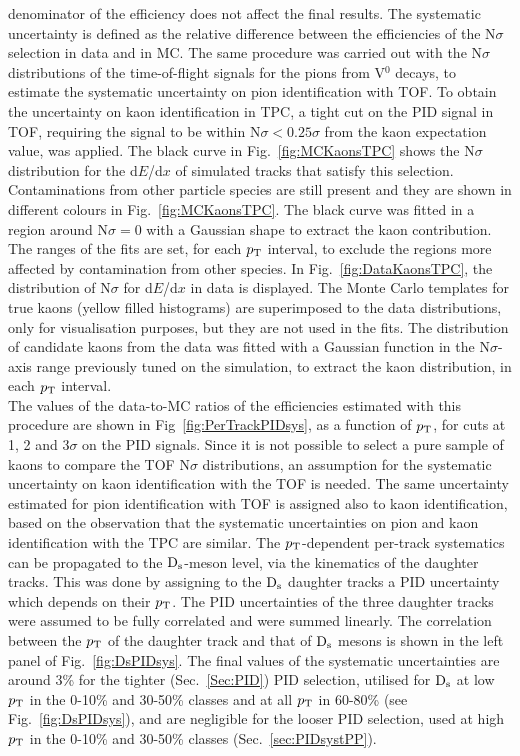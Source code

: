 denominator of the efficiency does not affect the final results.
The systematic uncertainty is defined as the relative difference between the efficiencies 
 of the N$\sigma$ selection in data and in MC.
The same procedure
was carried out with the N$\sigma$ distributions of the time-of-flight signals 
for the pions from V$^0$ decays, to estimate the systematic uncertainty on pion identification with TOF.
To obtain the uncertainty on kaon identification in TPC, a tight cut on the PID 
signal in TOF, requiring the signal to be within N$\sigma < 0.25\sigma$ from the 
kaon expectation value, was applied. 
The black curve in Fig.~\ref{fig:MCKaonsTPC} shows the 
N$\sigma$ distribution for the d$E$/d$x$ of simulated tracks that satisfy this selection.
Contaminations from other particle species are still present and they
are shown in different colours in Fig.~\ref{fig:MCKaonsTPC}. 
The black curve was fitted in a region around N$\sigma=0$ with a Gaussian shape 
to extract the kaon contribution. The ranges of the fits are set, for each $p_{\rm T}$ interval, to exclude 
the regions more affected by contamination from other species.
In Fig.~\ref{fig:DataKaonsTPC}, the distribution of N$\sigma$ for d$E$/d$x$ in data is displayed. 
The Monte Carlo templates for true 
kaons (yellow filled histograms) are superimposed to the data distributions, 
only for visualisation purposes, but they are not used in the fits. The distribution of candidate kaons from the data
was fitted with a Gaussian function in the N$\sigma$-axis range previously tuned on the simulation,
to extract the kaon distribution, in each $p_{\rm T}$ interval.\\
The values of the data-to-MC ratios
of the efficiencies estimated with this procedure are shown in Fig~\ref{fig:PerTrackPIDsys}, as a function of $p_{\rm T}$,
for cuts at 1, 2 and 3$\sigma$ on the PID signals. 
Since it is not possible to select a pure sample of kaons to compare the TOF N$\sigma$
distributions, an assumption for the systematic uncertainty on kaon
identification with the TOF is needed. The same uncertainty estimated
for pion identification with TOF is assigned also to kaon identification, based on
the observation that the systematic uncertainties on pion and kaon identification
with the TPC are similar.
The $p_{\rm T}$-dependent per-track systematics can be propagated to the ${\rm D_s}$-meson level, via the kinematics of
the daughter tracks.
This was done by assigning to the ${\rm D_s}$ daughter tracks a PID uncertainty 
which depends on their $p_{\rm T}$. The PID uncertainties of the three daughter tracks
were assumed to be fully correlated and were summed linearly.
The correlation between the $p_{\rm T}$ of the daughter track and that of ${\rm D_s}$ mesons is shown in the
left panel of Fig.~\ref{fig:DsPIDsys}.
The final values of the systematic uncertainties are around 
3\% for the tighter (Sec.~\ref{Sec:PID}) PID selection, utilised for ${\rm D_s}$ at low $p_{\rm T}$ in the 0-10\% and 30-50\% classes and at all $p_{\rm T}$ in 60-80\% (see Fig.~\ref{fig:DsPIDsys}), and are negligible for the
looser PID selection, used at high $p_{\rm T}$ in the 0-10\% and 30-50\% classes (Sec.~\ref{sec:PIDsystPP}).

